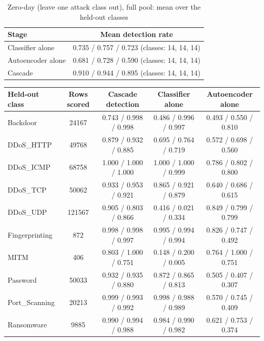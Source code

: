 \begin{table}[H]
\centering
\small
\setlength{\tabcolsep}{3pt}
\renewcommand{\arraystretch}{1.15}
\begin{tabular}{|l|c|}
\hline
\textbf{Stage} & \textbf{Mean detection rate} \\ \hline
Classifier alone & 0.735 / 0.757 / 0.723 (classes: 14, 14, 14) \\ \hline
Autoencoder alone & 0.681 / 0.728 / 0.590 (classes: 14, 14, 14) \\ \hline
Cascade & 0.910 / 0.944 / 0.895 (classes: 14, 14, 14) \\ \hline
\end{tabular}
\caption{Zero-day (leave one attack class out), full pool: mean over the held-out classes}
\label{tab:full_zeroday_mean}
\end{table}
\begin{table}[H]
\centering
\scriptsize
\setlength{\tabcolsep}{3pt}
\renewcommand{\arraystretch}{1.15}
\begin{tabular}{|l|c|c|c|c|}
\hline
\textbf{Held-out class} & \textbf{Rows scored} & \textbf{Cascade detection} & \textbf{Classifier alone} & \textbf{Autoencoder alone} \\ \hline
Backdoor & 24167 & 0.743 / 0.998 / 0.998 & 0.486 / 0.996 / 0.997 & 0.493 / 0.550 / 0.810 \\ \hline
DDoS\_HTTP & 49768 & 0.879 / 0.932 / 0.885 & 0.695 / 0.764 / 0.719 & 0.572 / 0.698 / 0.560 \\ \hline
DDoS\_ICMP & 68758 & 1.000 / 1.000 / 1.000 & 1.000 / 1.000 / 0.999 & 0.786 / 0.802 / 0.800 \\ \hline
DDoS\_TCP & 50062 & 0.933 / 0.953 / 0.921 & 0.865 / 0.921 / 0.879 & 0.640 / 0.686 / 0.615 \\ \hline
DDoS\_UDP & 121567 & 0.905 / 0.803 / 0.866 & 0.416 / 0.021 / 0.334 & 0.849 / 0.799 / 0.799 \\ \hline
Fingerprinting & 872 & 0.998 / 0.998 / 0.997 & 0.995 / 0.994 / 0.994 & 0.826 / 0.747 / 0.492 \\ \hline
MITM & 406 & 0.803 / 1.000 / 0.751 & 0.148 / 0.200 / 0.005 & 0.764 / 1.000 / 0.751 \\ \hline
Password & 50033 & 0.932 / 0.935 / 0.880 & 0.872 / 0.865 / 0.813 & 0.505 / 0.407 / 0.307 \\ \hline
Port\_Scanning & 20213 & 0.999 / 0.993 / 0.992 & 0.998 / 0.988 / 0.989 & 0.570 / 0.745 / 0.409 \\ \hline
Ransomware & 9885 & 0.990 / 0.994 / 0.988 & 0.984 / 0.990 / 0.982 & 0.621 / 0.753 / 0.374 \\ \hline

\end{tabular}
\end{table}
